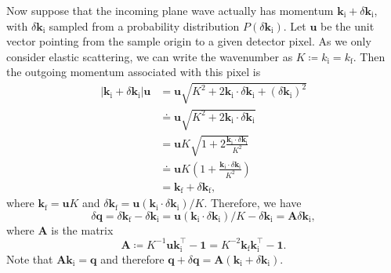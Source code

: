 \documentclass[11pt,a4paper]{article}
\def\v#1{\bm{{#1}}}
\def\tr{^\intercal}
\def\si{\text{i}}
\def\sf{\text{f}}
\def\k{{\v{k}}}
\def\q{{\v{q}}}
\def\bu{\v{u}}
\begin{document}
Now suppose that the incoming plane wave actually has momentum $\k_\si + \delta \k_\si$, with $\delta \k_\si$ sampled from a probability distribution $P(\delta \k_\si)$.
Let $\bu$ be the unit vector pointing from the sample origin to a given detector pixel.
As we only consider elastic scattering,
we can write the wavenumber as $K\coloneqq k_\si = k_\sf$.
Then the outgoing momentum associated with this pixel is
\begin{align}
  |\k_\si + \delta \k_\si| \bu &= \bu \sqrt{K^2  + 2 \k_\si \cdot \delta \k_\si + (\delta \k_\si)^2 } \\
  &\doteq \bu\sqrt{K^2  + 2 \k_\si \cdot \delta \k_\si} \\
  &= \bu K\sqrt{1+ 2\frac{\k_\si \cdot \delta \k_\si}{K^2}} \\
  &\doteq \bu K \left(1 +  \frac{\k_\si \cdot \delta \k_\si}{K^2}\right) \\
  &= \k_\sf + \delta \k_\sf,
\end{align}
where $\k_\sf = \bu K$ and $\delta \k_\sf = \bu(\k_\si \cdot \delta \k_\si) / K$. Therefore, we have
\begin{equation}
  \delta\q
  = \delta \k_\sf - \delta \k_\si = \bu(\k_\si \cdot \delta \k_\si) / K - \delta \k_\si
  = \v{A} \delta \k_\si,
\end{equation}
where $\v{A}$ is the matrix
\begin{equation}
\v{A} \coloneqq K^{-1} \bu \k_\si\tr - \v1 = K^{-2} \k_\sf \k_\si\tr - \v1.
\end{equation}
Note that $\v{A} \k_\si = \q$ and therefore
$\q + \delta \q = \v{A}(\k_\si + \delta \k_\si)$.
\end{document}
